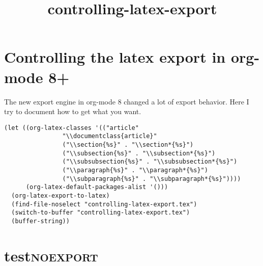\documentclass{revtex4}
\date{}
\title{controlling-latex-export}
\begin{document}
\maketitle

\section{Controlling the latex export in org-mode 8+}
\label{sec-1}

The new export engine in org-mode 8 changed a lot of export behavior. Here I try to document how to get what you want. 

\begin{verbatim}
(let ((org-latex-classes '(("article"
			    "\\documentclass{article}"
			    ("\\section{%s}" . "\\section*{%s}")
			    ("\\subsection{%s}" . "\\subsection*{%s}")
			    ("\\subsubsection{%s}" . "\\subsubsection*{%s}")
			    ("\\paragraph{%s}" . "\\paragraph*{%s}")
			    ("\\subparagraph{%s}" . "\\subparagraph*{%s}"))))
      (org-latex-default-packages-alist '()))
  (org-latex-export-to-latex)
  (find-file-noselect "controlling-latex-export.tex")
  (switch-to-buffer "controlling-latex-export.tex")
  (buffer-string))
\end{verbatim}


\section{test\hfill{}\textsc{noexport}}
\label{sec-2}
\end{document}
